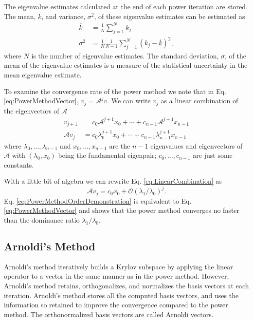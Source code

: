 \documentclass[12]{ansnse}
\newcommand{\A}{\ensuremath{\mathcal{A}}}
\begin{document}
\begin{doublespace}
The eigenvalue estimates calculated at the end of each power iteration are stored.  The mean, $\overline{k}$, and variance, $\sigma^2$, of these eigenvalue estimates can be estimated as
\begin{align}
    \overline{k} &= \frac{1}{N}\sum_{j=1}^N k_j \label{eq:meanEigenvalue} \\
    \sigma^2 &= \frac{1}{N}\frac{1}{N-1} \sum_{j=1}^N \left(k_j - \overline{k}\right)^2, \label{eq:varEigenvalue}
\end{align}
where $N$ is the number of eigenvalue estimates.  The standard deviation, $\sigma$, of the mean of the eigenvalue estimates is a measure of the statistical uncertainty in the mean eigenvalue estimate.

To examine the convergence rate of the power method we note that in Eq. \eqref{eq:PowerMethodVector}, $v_{j} = \A^{j}v$.  We can write $v_j$ as a linear combination of the eigenvectors of \A
\begin{align}
    v_{j+1} &= c_0\A^{j+1}x_0 + \cdots + c_{n-1}\A^{j+1}x_{n-1} \\
    \A v_{j} &= c_0\lambda_0^{j+1}x_0 + \cdots + c_{n-1}\lambda_{n-1}^{j+1}x_{n-1}
    \label{eq:LinearCombination}
\end{align}
where $\lambda_0, \ldots, \lambda_{n-1}$ and $x_0, \ldots, x_{n-1}$ are the \mbox{$n-1$} eigenvalues and eigenvectors of \A{} with $\left(\lambda_0, x_0\right)$ being the fundamental eigenpair; $c_0, \ldots, c_{n-1}$ are just some constants.

With a little bit of algebra we can rewrite Eq. \eqref{eq:LinearCombination} as
\begin{equation}
    \A v_j = c_0x_0 + \mathcal{O}(\lambda_1/\lambda_0)^j.
    \label{eq:PowerMethodOrderDemonstration}
\end{equation}
Eq. \eqref{eq:PowerMethodOrderDemonstration} is equivalent to Eq. \eqref{eq:PowerMethodVector} and shows that the power method converges no faster than the dominance ratio $\lambda_1/\lambda_0$.

\subsection{Arnoldi's Method}\label{sec:ArnoldiExplanation}
Arnoldi's method\cite{Arnoldi:1951The-P-0} iteratively builds a Krylov subspace by applying the linear operator to a vector in the same manner as in the power method.  However, Arnoldi's method retains, orthogonalizes, and normalizes the basis vectors at each iteration.  Arnoldi's method stores all the computed basis vectors, and uses the information so retained to improve the convergence compared to the power method.  The orthonormalized basis vectors are called Arnoldi vectors.


\end{doublespace}
\end{document}
